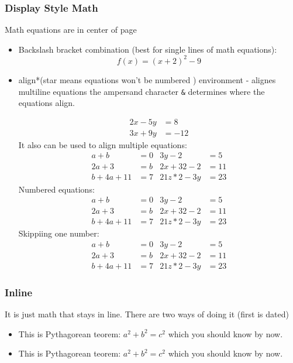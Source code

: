 \documentclass{article}
\begin{document}
\subsubsection{Display Style Math}
Math equations are in center of page
\begin{itemize}
    \item Backslash bracket combination (best for single lines of math equations):
    \[f(x) = (x + 2)^2 - 9\]
    \item align*(star means equations won't be numbered   ) environment - alignes multiline equations
    the ampersand character \texttt{\&} determines where the equations align.
    
\begin{align*} 
2x - 5y &=  8 \\ 
3x + 9y &=  -12
\end{align*}
It also can be used to align multiple equations:
\begin{align*}
    a + b & = 0         & 3y - 2 & = 5 \\
    2a + 3 & = b        & 2x + 32 - 2 & = 11 \\
    b + 4a + 11 & = 7   & 21z * 2 - 3y & = 23
\end{align*}
Numbered equations: 
\begin{align}
    a + b & = 0         & 3y - 2 & = 5 \\
    2a + 3 & = b        & 2x + 32 - 2 & = 11 \\
    b + 4a + 11 & = 7   & 21z * 2 - 3y & = 23
\end{align}
Skippiing one number:
\begin{align}
    a + b & = 0         & 3y - 2 & = 5 \\
    2a + 3 & = b        & 2x + 32 - 2 & = 11 \nonumber \\
    b + 4a + 11 & = 7   & 21z * 2 - 3y & = 23
\end{align}
\end{itemize}
\subsubsection{Inline}
It is just math that stays in line. There are two ways of doing it (first is dated)
\begin{itemize}
    \item This is Pythagorean teorem: $a^2 + b^2 = c^2$ which you should know by now.
    \item This is Pythagorean teorem: \(a^2 + b^2 = c^2\) which you should know by now.
\end{itemize}
\end{document}
